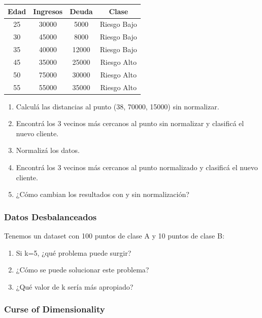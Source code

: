 \documentclass[12pt]{article}
\begin{document}
\begin{table}[H]
    \centering
    \begin{tabular}{cccc}
        \toprule
        \textbf{Edad} & \textbf{Ingresos} & \textbf{Deuda} & \textbf{Clase} \\
        \midrule
        25 & 30000 & 5000 & Riesgo Bajo \\
        30 & 45000 & 8000 & Riesgo Bajo \\
        35 & 40000 & 12000 & Riesgo Bajo \\
        45 & 35000 & 25000 & Riesgo Alto \\
        50 & 75000 & 30000 & Riesgo Alto \\
        55 & 55000 & 35000 & Riesgo Alto \\
        \bottomrule
    \end{tabular}
\end{table}

\begin{enumerate}
    \item Calculá las distancias al punto (38, 70000, 15000) sin normalizar.
    \item Encontrá los 3 vecinos más cercanos al punto sin normalizar y clasificá el nuevo cliente.
    \item Normalizá los datos.
    \item Encontrá los 3 vecinos más cercanos al punto normalizado y clasificá el nuevo cliente.
    \item ¿Cómo cambian los resultados con y sin normalización?
\end{enumerate}

\subsubsection{Datos Desbalanceados}

Tenemos un dataset con 100 puntos de clase A y 10 puntos de clase B:

\begin{enumerate}
    \item Si k=5, ¿qué problema puede surgir?
    \item ¿Cómo se puede solucionar este problema?
    \item ¿Qué valor de k sería más apropiado?
\end{enumerate}

\subsubsection{Curse of Dimensionality}
\end{document}
